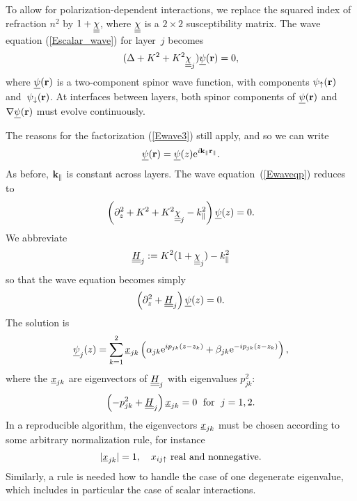 To allow for polarization-dependent interactions,
we replace the squared index of refraction $n^2$
by $1+\underline{\underline{\chi}}$, where $\underline{\underline{\chi}}$ is a $2\times 2$ susceptibility matrix.
The wave equation (\ref{Escalar_wave}) for layer~$j$ becomes
\begin{equation}\label{Ewaveqp}  
(\Delta +K^2 +K^2 \underline{\underline{\chi}}_j) \underline{\psi}(\mathbf{r})= 0,
\end{equation}
where $\underline{\psi}(\mathbf{r})$ is a two-component spinor wave function,
with components $\psi_\uparrow(\mathbf{r})$ and~$\psi_\downarrow(\mathbf{r})$.
At interfaces between layers,
both spinor components of $\underline{\psi}(\mathbf{r})$ and $\mathbf{\nabla}\underline{\psi}(\mathbf{r})$
must evolve continuously.

The reasons for the factorization (\ref{Ewave3}) still apply,
and so we can write
\begin{equation}\label{Ewave3p}
\underline{\psi}(\mathbf{r}) = \underline{\psi}(z) \text{e}^{i \mathbf{k}_\parallel\mathbf{r}_\parallel}.
\end{equation}
As before, $\mathbf{k}_\parallel$ is constant across layers.
The wave equation~(\ref{Ewaveqp}) reduces to 
\begin{equation}\label{Ewavezp}
\left(\partial_z^2 + K^2 + K^2\underline{\underline{\chi}}_j - k_\parallel^2 \right) \underline{\psi}(z) = 0.
\end{equation}
We abbreviate
\begin{equation}
  \underline{\underline{H}}_j := K^2(1+\underline{\underline{\chi}}_j)-k_\parallel^2
\end{equation}
so that the wave equation becomes simply
\begin{equation}\label{Ewaveqp2}
  \left(\partial_z^2 + \underline{\underline{H}}_j\right) \underline{\psi}(z) = 0.
\end{equation}
The solution is
\begin{equation}\label{Epsizp}
  \underline{\psi}_j(z)
  = \sum_{k=1}^2 \underline{x}_{jk}\left(\alpha_{jk}\text{e}^{i p_{jk}(z-z_k)}
                            + \beta_{jk}\text{e}^{-i p_{jk}(z-z_k)}\right),
\end{equation}
where the $\underline{x}_{jk}$ are eigenvectors of $\underline{\underline{H}}_j$
with eigenvalues $p_{jk}^2$:
\begin{equation}
  \left( -p_{jk}^2 + \underline{\underline{H}}_j \right) \underline{x}_{jk} = 0
   \;\text{ for }\;j=1,2.
\end{equation}
In a reproducible algorithm,
the eigenvectors $\underline{x}_{jk}$ must be chosen according to some arbitrary
normalization rule,
for instance
\begin{equation}
  |\underline{x}_{jk}|=1,\quad x_{ij\uparrow} \text{ real and nonnegative}.
\end{equation}
Similarly,
a rule is needed how to handle the case of one degenerate eigenvalue,
which includes in particular the case of scalar interactions.


